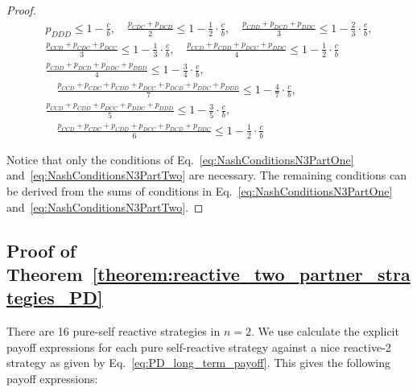 \documentclass[11pt]{article}
\theoremstyle{plainCl1}
\theoremstyle{plainCl2}
\begin{document}
\begin{proof}
\begin{align}
  p_{DDD} \leq 1 \!- \!\frac{c}{b},
  \quad \frac{p_{CDC} + p_{DCD}}{2} \leq 1 - \frac{1}{2} \cdot \frac{c}{b}, 
  \quad \frac{p_{CDD} + p_{DCD} + p_{DDC}}{3} \leq 1 - \frac{2}{3} \cdot \frac{c}{b}, \label{eq:NashConditionsN3PartOne} \\[.5em]
  \frac{p_{CCD} + p_{CDC} + p_{DCC}}{3} \leq 1 - \frac{1}{3} \cdot \frac{c}{b},
  \quad \frac{p_{CCD} + p_{CDD} + p_{DCC} + p_{DDC}}{4} \leq 1 - \frac{1}{2}  \cdot \frac{c}{b} \label{eq:NashConditionsN3PartTwo} \\[.5em]
  \frac{p_{CDD} + p_{DCD} + p_{DDC} + p_{DDD}}{4} \leq 1 - \frac{3}{4} \cdot \frac{c}{b}, \\[.5em]
  \quad \frac{p_{CCD} + p_{CDC} + p_{CDD} + p_{DCC} + p_{DCD} + p_{DDC} + p_{DDD}}{7} \leq 1 - \frac{4}{7} \cdot \frac{c}{b}, \\[.5em]
  \frac{p_{CCD} + p_{CDD} + p_{DCC} + p_{DDC} + p_{DDD}}{5} \leq 1 - \frac{3}{5} \cdot \frac{c}{b}, \\[.5em]
  \quad \frac{p_{CCD} + p_{CDC} + p_{CDD} + p_{DCC} + p_{DCD} + p_{DDC}}{6} \leq 1 - \frac{1}{2} \cdot \frac{c}{b}
\end{align}

Notice that only the conditions of Eq.~\eqref{eq:NashConditionsN3PartOne}
and~\eqref{eq:NashConditionsN3PartTwo} are necessary. The remaining conditions can
be derived from the sums of conditions in Eq.~\eqref{eq:NashConditionsN3PartOne}
and~\eqref{eq:NashConditionsN3PartTwo}.
\end{proof}


\subsection{Proof of Theorem~\ref{theorem:reactive_two_partner_strategies_PD}}\label{appendix:reactive_two_pure_self_reactive_pd}

There are 16 pure-self reactive strategies in $n=2$. We use calculate the
explicit payoff expressions for each pure self-reactive strategy against a nice
reactive-2 strategy as given by Eq.~\eqref{eq:PD_long_term_payoff}.
This gives the following payoff expressions:
\end{document}
